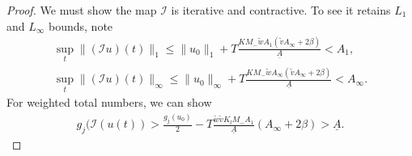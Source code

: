 \begin{proof}
We must show the map $\mathcal I$ is iterative and contractive. 
To see it retains $L_1$ and $L_\infty$ bounds, note
\begin{eqnarray}
\sup_t \|(\mathcal Iu)(t)\|_1 \le \|u_0\|_1+T\frac{K M_{-}\tilde wA_{1}  (\tilde v A_\infty+2\beta) }{\underline A} < A_1,\\
\sup_t \|(\mathcal Iu)(t)\|_\infty \le \|u_0\|_\infty+T\frac{KM_-\tilde w  A_\infty(\tilde vA_\infty+2\beta)}{\underline A} < A_\infty.\nonumber
\end{eqnarray}
For weighted total numbers, we can show
\begin{eqnarray}
g_j(\mathcal I(u(t)) > \frac{g_j (u_0)}{2} -T\frac{\tilde w \tilde v K_lM_-A_1}{\underline{ A}}(A_\infty+2\beta) > \underline A.
\end{eqnarray}


\end{proof}
